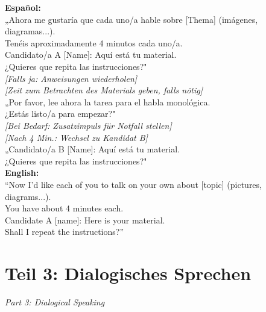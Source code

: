 \documentclass[11pt,a4paper]{article}
\newcommand{\bisection}[2]{%
    \section{#1}%
    {\small\color{englishgray}\textit{#2}}\par\vspace{6pt}%
}
\begin{document}
\begin{tcolorbox}[colback=lightgray, colframe=spanischrot, title=Gesprächsleitung / \textit{Discussion Leader}]
\textbf{Español:}\\
„Ahora me gustaría que cada uno/a hable sobre [Thema] (imágenes, diagramas...).\\
Tenéis aproximadamente 4 minutos cada uno/a.\\[0.2cm]
Candidato/a A [Name]: Aquí está tu material.\\
¿Quieres que repita las instrucciones?"\\[0.2cm]
\textit{[Falls ja: Anweisungen wiederholen]}\\
\textit{[Zeit zum Betrachten des Materials geben, falls nötig]}\\[0.2cm]
„Por favor, lee ahora la tarea para el habla monológica.\\
¿Estás listo/a para empezar?"\\[0.2cm]
\textit{[Bei Bedarf: Zusatzimpuls für Notfall stellen]}\\
\textit{[Nach 4 Min.: Wechsel zu Kandidat B]}\\[0.2cm]
„Candidato/a B [Name]: Aquí está tu material.\\
¿Quieres que repita las instrucciones?"\\[0.3cm]
{\color{englishgray}\textbf{English:}\\
``Now I'd like each of you to talk on your own about [topic] (pictures, diagrams...).\\
You have about 4 minutes each.\\
Candidate A [name]: Here is your material.\\
Shall I repeat the instructions?''}
\end{tcolorbox}

\bisection{Teil 3: Dialogisches Sprechen}{Part 3: Dialogical Speaking}
\end{document}
